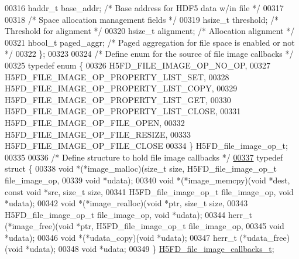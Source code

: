 \begin{DoxyCode}
00316     haddr\_t             base\_addr;      \textcolor{comment}{/* Base address for HDF5 data w/in file */}
00317 
00318     \textcolor{comment}{/* Space allocation management fields */}
00319     hsize\_t             threshold;      \textcolor{comment}{/* Threshold for alignment  */}
00320     hsize\_t             alignment;      \textcolor{comment}{/* Allocation alignment     */}
00321     hbool\_t             paged\_aggr;     \textcolor{comment}{/* Paged aggregation for file space is enabled or not */}
00322 \};
00323 
00324 \textcolor{comment}{/* Define enum for the source of file image callbacks */}
00325 \textcolor{keyword}{typedef} \textcolor{keyword}{enum} \{
00326     H5FD\_FILE\_IMAGE\_OP\_NO\_OP,
00327     H5FD\_FILE\_IMAGE\_OP\_PROPERTY\_LIST\_SET,     
00328     H5FD\_FILE\_IMAGE\_OP\_PROPERTY\_LIST\_COPY,
00329     H5FD\_FILE\_IMAGE\_OP\_PROPERTY\_LIST\_GET,
00330     H5FD\_FILE\_IMAGE\_OP\_PROPERTY\_LIST\_CLOSE,
00331     H5FD\_FILE\_IMAGE\_OP\_FILE\_OPEN,
00332     H5FD\_FILE\_IMAGE\_OP\_FILE\_RESIZE,
00333     H5FD\_FILE\_IMAGE\_OP\_FILE\_CLOSE
00334 \} H5FD\_file\_image\_op\_t;
00335 
00336 \textcolor{comment}{/* Define structure to hold file image callbacks */}
\hyperlink{struct_h5_f_d__file__image__callbacks__t}{00337} \textcolor{keyword}{typedef} \textcolor{keyword}{struct }\{
00338     \textcolor{keywordtype}{void}   *(*image\_malloc)(\textcolor{keywordtype}{size\_t} size, H5FD\_file\_image\_op\_t file\_image\_op, 
00339                             \textcolor{keywordtype}{void} *udata);
00340     \textcolor{keywordtype}{void}   *(*image\_memcpy)(\textcolor{keywordtype}{void} *dest, \textcolor{keyword}{const} \textcolor{keywordtype}{void} *src, \textcolor{keywordtype}{size\_t} size,
00341                             H5FD\_file\_image\_op\_t file\_image\_op, \textcolor{keywordtype}{void} *udata);
00342     \textcolor{keywordtype}{void}   *(*image\_realloc)(\textcolor{keywordtype}{void} *ptr, \textcolor{keywordtype}{size\_t} size, 
00343                             H5FD\_file\_image\_op\_t file\_image\_op, \textcolor{keywordtype}{void} *udata);
00344     herr\_t  (*image\_free)(\textcolor{keywordtype}{void} *ptr, H5FD\_file\_image\_op\_t file\_image\_op, 
00345                           \textcolor{keywordtype}{void} *udata);
00346     \textcolor{keywordtype}{void}   *(*udata\_copy)(\textcolor{keywordtype}{void} *udata);
00347     herr\_t  (*udata\_free)(\textcolor{keywordtype}{void} *udata);
00348     \textcolor{keywordtype}{void} *udata;
00349 \} \hyperlink{struct_h5_f_d__file__image__callbacks__t}{H5FD\_file\_image\_callbacks\_t};

\end{DoxyCode}
